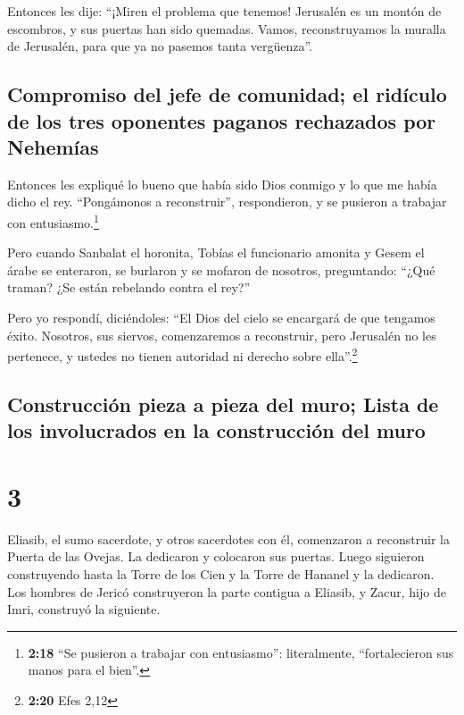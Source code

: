  Entonces les dije: ``¡Miren el problema que tenemos!
Jerusalén es un montón de escombros, y sus puertas han sido quemadas.
Vamos, reconstruyamos la muralla de Jerusalén, para que ya no pasemos
tanta vergüenza''.

\hypertarget{compromiso-del-jefe-de-comunidad-el-riduxedculo-de-los-tres-oponentes-paganos-rechazados-por-nehemuxedas}{%
\subsection{Compromiso del jefe de comunidad; el ridículo de los tres
oponentes paganos rechazados por
Nehemías}\label{compromiso-del-jefe-de-comunidad-el-riduxedculo-de-los-tres-oponentes-paganos-rechazados-por-nehemuxedas}}

 Entonces les expliqué lo bueno que había sido Dios
conmigo y lo que me había dicho el rey. ``Pongámonos a reconstruir'',
respondieron, y se pusieron a trabajar con entusiasmo.\footnote{\textbf{2:18}
  ``Se pusieron a trabajar con entusiasmo'': literalmente,
  ``fortalecieron sus manos para el bien''.}

 Pero cuando Sanbalat el horonita, Tobías el funcionario
amonita y Gesem el árabe se enteraron, se burlaron y se mofaron de
nosotros, preguntando: ``¿Qué traman? ¿Se están rebelando contra el
rey?''

 Pero yo respondí, diciéndoles: ``El Dios del cielo se
encargará de que tengamos éxito. Nosotros, sus siervos, comenzaremos a
reconstruir, pero Jerusalén no les pertenece, y ustedes no tienen
autoridad ni derecho sobre ella''.\footnote{\textbf{2:20} Efes 2,12}

\hypertarget{construcciuxf3n-pieza-a-pieza-del-muro-lista-de-los-involucrados-en-la-construcciuxf3n-del-muro}{%
\subsection{Construcción pieza a pieza del muro; Lista de los
involucrados en la construcción del
muro}\label{construcciuxf3n-pieza-a-pieza-del-muro-lista-de-los-involucrados-en-la-construcciuxf3n-del-muro}}

\hypertarget{section-2}{%
\section{3}\label{section-2}}

 Eliasib, el sumo sacerdote, y otros sacerdotes con él,
comenzaron a reconstruir la Puerta de las Ovejas. La dedicaron y
colocaron sus puertas. Luego siguieron construyendo hasta la Torre de
los Cien y la Torre de Hananel y la dedicaron.  Los
hombres de Jericó construyeron la parte contigua a Eliasib, y Zacur,
hijo de Imri, construyó la siguiente.

